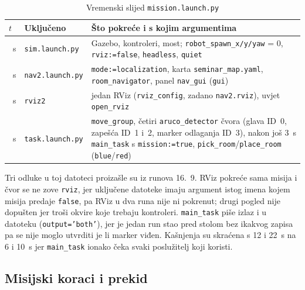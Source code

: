 \begin{table}[H]
\centering
\caption{Vremenski slijed \texttt{mission.launch.py}}
\label{tab:08-launch}
\footnotesize
\renewcommand{\arraystretch}{1.1}
\begin{tabularx}{\textwidth}{@{}>{\raggedright\arraybackslash}p{}>{\raggedright\arraybackslash}p{}>{\raggedright\arraybackslash}X@{}}
\toprule
\textbf{$t$} & \textbf{Uključeno} & \textbf{Što pokreće i s kojim argumentima} \\
\midrule
0~s & \texttt{sim.launch.py} & Gazebo, kontroleri, most; \texttt{robot\_spawn\_x/y/yaw} = 0, \texttt{rviz:=false}, \texttt{headless}, \texttt{quiet} \\
6~s & \texttt{nav2.launch.py} & \texttt{mode:=localization}, karta \texttt{seminar\_map.yaml}, \texttt{room\_navigator}, panel \texttt{nav\_gui} (\texttt{gui}) \\
8~s & \texttt{rviz2} & jedan RViz (\texttt{rviz\_config}, zadano \texttt{nav2.rviz}), uvjet \texttt{open\_rviz} \\
10~s & \texttt{task.launch.py} & \texttt{move\_group}, četiri \texttt{aruco\_detector} čvora (glava ID~0, zapešća ID~1 i~2, marker odlaganja ID~3), nakon još 3~s \texttt{main\_task} s \texttt{mission:=true}, \texttt{pick\_room}/\texttt{place\_room} (\texttt{blue}/\texttt{red}) \\
\bottomrule
\end{tabularx}
\end{table}

Tri odluke u toj datoteci proizašle su iz runova 16.~9. RViz pokreće sama misija i čvor se ne zove
\texttt{rviz}, jer uključene datoteke imaju argument istog imena kojem misija predaje \texttt{false}, pa
RViz u dva runa nije ni pokrenut; drugi pogled nije dopušten jer troši okvire koje trebaju kontroleri.
\texttt{main\_task} piše izlaz i u datoteku (\texttt{output='both'}), jer je jedan run stao pred stolom
bez ikakvog zapisa pa se nije moglo utvrditi je li marker viđen. Kašnjenja su skraćena s 12 i 22~s na
6 i 10~s jer \texttt{main\_task} ionako čeka svaki poslužitelj koji koristi.

\subsection{Misijski koraci i prekid}
\label{sec:08-koraci}

